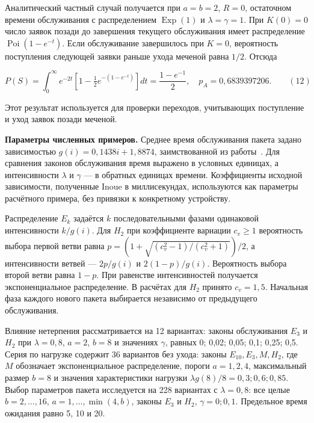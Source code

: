 Аналитический частный случай получается при $a=b=2$, $R=0$, остаточном времени обслуживания с распределением $\operatorname{Exp}(1)$ и $\lambda=\gamma=1$. При $K(0)=0$ число заявок позади до завершения текущего обслуживания имеет распределение $\operatorname{Poi}(1-e^{-t})$. Если обслуживание завершилось при $K=0$, вероятность поступления следующей заявки раньше ухода меченой равна $1/2$. Отсюда

\[P(S)=\int_0^\infty e^{-2t}\left[1-\tfrac12 e^{-(1-e^{-t})}\right]dt
 =\frac{1-e^{-1}}2,\quad p_A=0{,}6839397206.\qquad (12)\]

Этот результат используется для проверки переходов, учитывающих поступление и уход заявок позади меченой.

\noindent\textbf{Параметры численных примеров.}
Среднее время обслуживания пакета задано зависимостью $g(i)=0{,}1438i+1{,}8874$, заимствованной из работы~\cite{inoue2021}. Для сравнения законов обслуживания время выражено в условных единицах, а интенсивности $\lambda$ и $\gamma$ --- в обратных единицах времени. Коэффициенты исходной зависимости, полученные Inoue в миллисекундах, используются как параметры расчётного примера, без привязки к конкретному устройству.

Распределение $E_k$ задаётся $k$ последовательными фазами одинаковой интенсивности $k/g(i)$. Для $H_2$ при коэффициенте вариации $c_v\geq1$ вероятность выбора первой ветви равна $p=(1+\sqrt{(c_v^2-1)/(c_v^2+1)})/2$, а интенсивности ветвей --- $2p/g(i)$ и $2(1-p)/g(i)$. Вероятность выбора второй ветви равна $1-p$. При равенстве интенсивностей получается экспоненциальное распределение. В расчётах для $H_2$ принято $c_v=1{,}5$. Начальная фаза каждого нового пакета выбирается независимо от предыдущего обслуживания.

Влияние нетерпения рассматривается на 12 вариантах: законы обслуживания $E_3$ и $H_2$ при $\lambda=0{,}8$, $a=2$, $b=8$ и значениях $\gamma$, равных 0; 0,02; 0,05; 0,1; 0,25; 0,5. Серия по нагрузке содержит 36 вариантов без ухода: законы $E_{10},E_3,M,H_2$, где $M$ обозначает экспоненциальное распределение, пороги $a=1,2,4$, максимальный размер $b=8$ и значения характеристики нагрузки $\lambda g(8)/8=0{,}3;0{,}6;0{,}85$. Выбор параметров пакета исследуется на 228 вариантах с $\lambda=0{,}8$: все целые $b=2,\ldots,16$, $a=1,\ldots,\min(4,b)$, законы $E_3$ и $H_2$, $\gamma=0;0{,}1$. Предельное время ожидания равно 5, 10 и 20.


